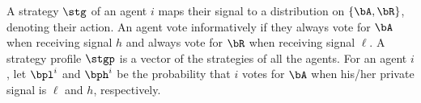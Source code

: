 
A strategy $\stg$ of an agent $i$ maps their signal to a distribution on $\{\bA,\bR\}$, denoting their action. An agent vote informatively if they always vote for $\bA$ when receiving signal $h$ and always vote for $\bR$ when receiving signal $\ell$. A strategy profile $\stgp$ is a vector of the strategies of all the agents. For an agent $i$, let $\bpl^i$ and $\bph^i$ be the probability that $i$ votes for $\bA$ when his/her private signal is $\ell$ and $h$, respectively. 

